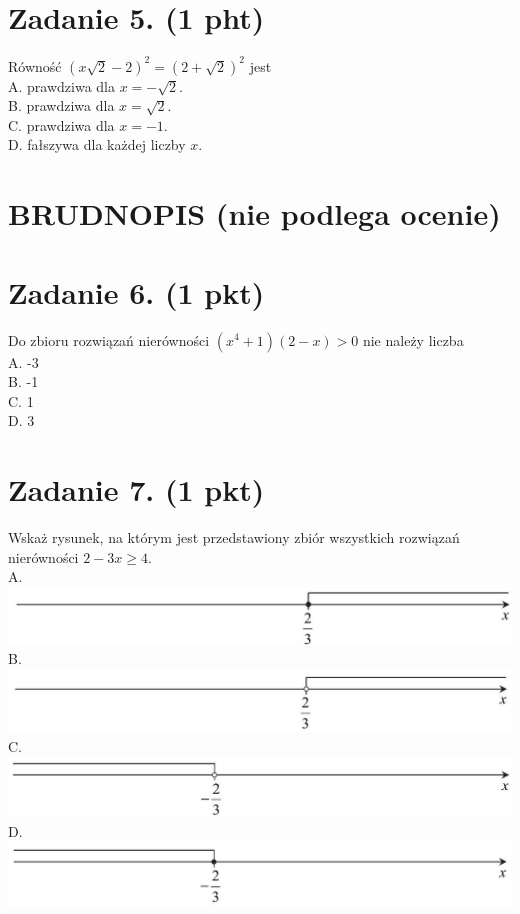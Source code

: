 \documentclass[10pt]{article}
\begin{document}
\section*{Zadanie 5. (1 pht)}
Równość \((x \sqrt{2}-2)^{2}=(2+\sqrt{2})^{2}\) jest\\
A. prawdziwa dla \(x=-\sqrt{2}\).\\
B. prawdziwa dla \(x=\sqrt{2}\).\\
C. prawdziwa dla \(x=-1\).\\
D. fałszywa dla każdej liczby \(x\).

\section*{BRUDNOPIS (nie podlega ocenie)}
\section*{Zadanie 6. (1 pkt)}
Do zbioru rozwiązań nierówności \(\left(x^{4}+1\right)(2-x)>0\) nie należy liczba\\
A. -3\\
B. -1\\
C. 1\\
D. 3

\section*{Zadanie 7. (1 pkt)}
Wskaż rysunek, na którym jest przedstawiony zbiór wszystkich rozwiązań nierówności \(2-3 x \geq 4\).\\
A.\\
\includegraphics[max width=\textwidth, center]{2024_11_21_ad8c43efe74fa059d24eg-04(1)}\\
B.\\
\includegraphics[max width=\textwidth, center]{2024_11_21_ad8c43efe74fa059d24eg-04(3)}\\
C.\\
\includegraphics[max width=\textwidth, center]{2024_11_21_ad8c43efe74fa059d24eg-04(2)}\\
D.\\
\includegraphics[max width=\textwidth, center]{2024_11_21_ad8c43efe74fa059d24eg-04}
\end{document}
